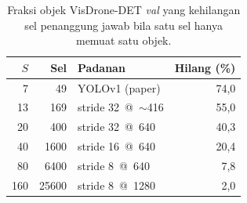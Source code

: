 \begin{table}[t]
\caption{Fraksi objek VisDrone-DET \textit{val} yang kehilangan sel penanggung jawab bila satu sel hanya memuat satu objek.}
\label{tab:grid}
\centering\scriptsize
\begin{tabular}{rrlr}
\toprule
$S$ & Sel & Padanan & Hilang (\%) \\
\midrule
7 & 49 & YOLOv1 (paper) & 74,0 \\
13 & 169 & stride 32 \,@\, $\sim$416 & 55,0 \\
20 & 400 & stride 32 \,@\, 640 & 40,3 \\
40 & 1600 & stride 16 \,@\, 640 & 20,4 \\
80 & 6400 & stride 8 \,@\, 640 & 7,8 \\
160 & 25600 & stride 8 \,@\, 1280 & 2,0 \\
\bottomrule
\end{tabular}
\end{table}
